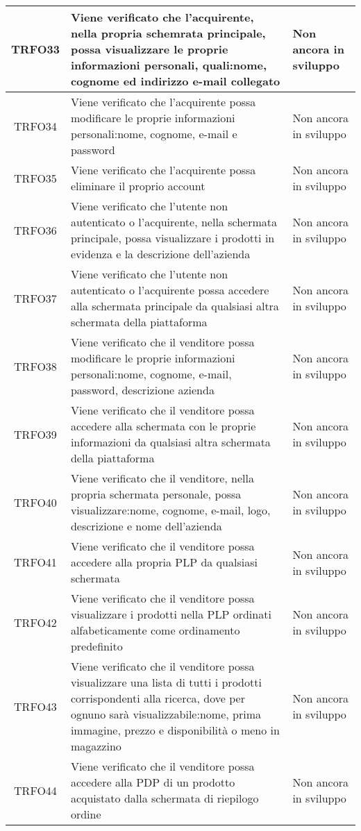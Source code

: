 \begin{longtable}{|c| C{10cm} |C{3cm}|}
	TRFO33 & Viene verificato che l'acquirente, nella propria schemrata principale, possa visualizzare le proprie informazioni personali, quali:nome, cognome ed indirizzo e-mail collegato & Non ancora in sviluppo\\ \hline
	TRFO34 & Viene verificato che l'acquirente possa modificare le proprie informazioni personali:nome, cognome, e-mail e password & Non ancora in sviluppo\\ \hline
	TRFO35 & Viene verificato che l'acquirente possa eliminare il proprio account & Non ancora in sviluppo\\ \hline
	TRFO36 & Viene verificato che l'utente non autenticato o l'acquirente, nella schermata principale, possa visualizzare i prodotti in evidenza e la descrizione dell'azienda & Non ancora in sviluppo\\ \hline
	TRFO37 & Viene verificato che l'utente non autenticato o l'acquirente possa accedere alla schermata principale da qualsiasi altra schermata della piattaforma & Non ancora in sviluppo\\ \hline
    TRFO38 & Viene verificato che il venditore possa modificare le proprie informazioni personali:nome, cognome, e-mail, password, descrizione azienda & Non ancora in sviluppo\\ \hline
	TRFO39 & Viene verificato che il venditore possa accedere alla schermata con le proprie informazioni da qualsiasi altra schermata della piattaforma & Non ancora in sviluppo\\ \hline
    TRFO40 & Viene verificato che il venditore, nella propria schermata personale, possa visualizzare:nome, cognome, e-mail, logo, descrizione e nome dell'azienda & Non ancora in sviluppo\\ \hline
	TRFO41 & Viene verificato che il venditore possa accedere alla propria PLP da qualsiasi schermata & Non ancora in sviluppo\\ \hline
	TRFO42 & Viene verificato che il venditore possa visualizzare i prodotti nella PLP ordinati alfabeticamente come ordinamento predefinito & Non ancora in sviluppo\\ \hline
	TRFO43 & Viene verificato che il venditore possa visualizzare una lista di tutti i prodotti corrispondenti alla ricerca, dove per ognuno sarà visualizzabile:nome, prima immagine, prezzo e disponibilità o meno in magazzino & Non ancora in sviluppo\\ \hline
	TRFO44 & Viene verificato che il venditore possa accedere alla PDP di un prodotto acquistato dalla schermata di riepilogo ordine & Non ancora in sviluppo\\ \hline

\end{longtable}

